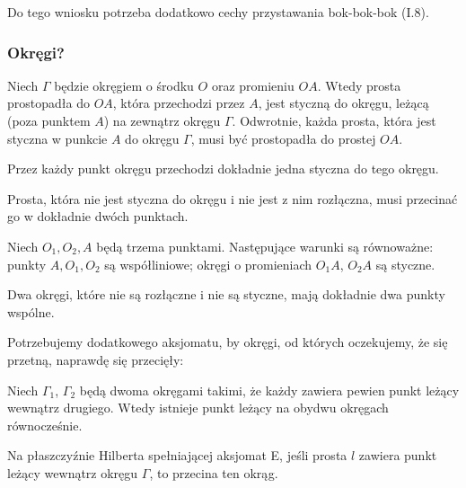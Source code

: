 Do tego wniosku potrzeba dodatkowo cechy przystawania bok-bok-bok (I.8).

\subsubsection{Okręgi?}

\begin{proposition}
    Niech $\Gamma$ będzie okręgiem o środku $O$ oraz promieniu $OA$.
    Wtedy prosta prostopadła do $OA$, która przechodzi przez $A$, jest styczną do okręgu, leżącą (poza punktem $A$) na zewnątrz okręgu $\Gamma$.
    Odwrotnie, każda prosta, która jest styczna w punkcie $A$ do okręgu $\Gamma$, musi być prostopadła do prostej $OA$.
\end{proposition} %

\begin{corollary}
    Przez każdy punkt okręgu przechodzi dokładnie jedna styczna do tego okręgu.
\end{corollary} %

\begin{corollary}
    Prosta, która nie jest styczna do okręgu i nie jest z nim rozłączna, musi przecinać go w dokładnie dwóch punktach.
\end{corollary} %

\begin{proposition}
    Niech $O_1, O_2, A$ będą trzema punktami.
    Następujące warunki są równoważne: punkty $A, O_1, O_2$ są współliniowe; okręgi o promieniach $O_1A$, $O_2A$ są styczne.
\end{proposition} %

\begin{corollary}
    Dwa okręgi, które nie są rozłączne i nie są styczne, mają dokładnie dwa punkty wspólne.
\end{corollary} %

Potrzebujemy dodatkowego aksjomatu, by okręgi, od których oczekujemy, że się przetną, naprawdę się przecięły:

\begin{axiom}
    \label{axiom_e}
    Niech $\Gamma_1$, $\Gamma_2$ będą dwoma okręgami takimi, że każdy zawiera pewien punkt leżący wewnątrz drugiego.
    Wtedy istnieje punkt leżący na obydwu okręgach równocześnie.
\end{axiom}

\begin{proposition}
    Na płaszczyźnie Hilberta spełniającej aksjomat E, jeśli prosta $l$ zawiera punkt leżący wewnątrz okręgu $\Gamma$, to przecina ten okrąg.
\end{proposition}

